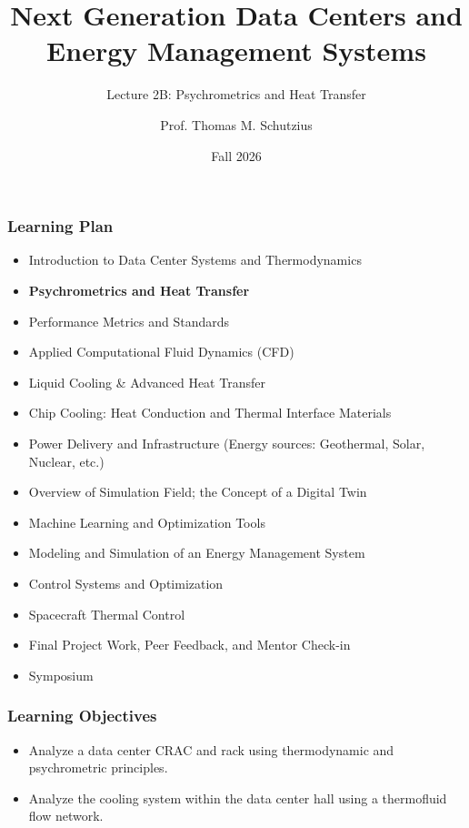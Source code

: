 \documentclass[aspectratio=169,10pt,xcolor={table,dvipsnames},t]{beamer}
\title[lecture 02]{Next Generation Data Centers and Energy Management Systems}
\subtitle{Lecture 2B: Psychrometrics and Heat Transfer}
\author{Prof. Thomas M. Schutzius}
\institute{Department of Mechanical Engineering}
\date{Fall 2026}
\begin{document}
\begin{frame}
  \titlepage
\end{frame}


{
\smallframetitle
	\begin{frame}
		\frametitle{Learning Plan}
		\begin{itemize}
			\item Introduction to Data Center Systems and Thermodynamics 
			\item \textbf{Psychrometrics and Heat Transfer}
			\item Performance Metrics and Standards 
			\item Applied Computational Fluid Dynamics (CFD)
			\item Liquid Cooling \& Advanced Heat Transfer 
			\item Chip Cooling: Heat Conduction and Thermal Interface Materials 
			\item Power Delivery and Infrastructure (Energy sources: Geothermal, Solar, Nuclear, etc.)
			\item Overview of Simulation Field; the Concept of a Digital Twin 
			\item Machine Learning and Optimization Tools 
			\item Modeling and Simulation of an Energy Management System 
			\item Control Systems and Optimization 
			\item Spacecraft Thermal Control
			\item Final Project Work, Peer Feedback, and Mentor Check-in 
			\item Symposium 
		\end{itemize}		
	\end{frame}
}

{
\smallframetitle
	\begin{frame}
		\frametitle{Learning Objectives}
		\begin{itemize}
			\item Analyze a data center CRAC and rack using thermodynamic and psychrometric principles.
			\item Analyze the cooling system within the data center hall using a thermofluid flow network.
		\end{itemize}		
	\end{frame}
}
\end{document}
